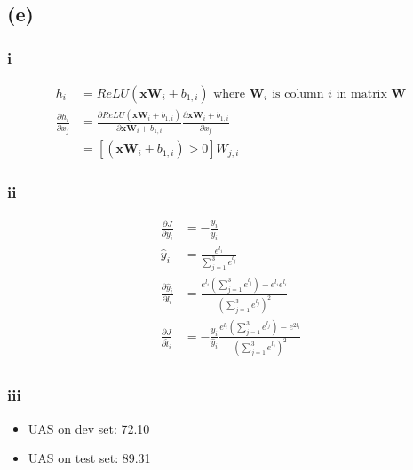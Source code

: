 \documentclass[11pt]{article}
\newcommand{\bvec}[1]{\textbf{#1}}
\begin{document}
\begin{enumerate}
\subsection*{(e)}
\subsubsection*{i}
  \begin{align*}
    h_i &= ReLU(\bvec{x}\bvec{W}_i+b_{1,i}) \text{  where $\bvec{W}_i$ is column $i$ in matrix $\bvec{W}$}\\
    \frac{\partial h_i}{\partial x_j} &= \frac{\partial ReLU(\bvec{x}\bvec{W}_i+b_{1,i})}{\partial \bvec{x}\bvec{W}_i+b_{1,i}} \frac{\partial \bvec{x}\bvec{W}_i+b_{1,i}}{\partial x_j}\\
      &= [(\bvec{x}\bvec{W}_i+b_{1,i}) > 0]W_{j, i}
  \end{align*}

\subsubsection*{ii}
  \begin{align*}
    \frac{\partial J}{\partial \hat{y}_i} &= -\frac{y_i}{\hat{y}_i}\\
    \hat{y}_i &= \frac{e^{l_i}}{\sum_{j=1}^{3}e^{l_j}}\\
    \frac{\partial \hat{y}_i}{\partial l_i} &= \frac{e^{l_i}(\sum_{j=1}^{3}e^{l_j}) - e^{l_i}e^{l_i}}{(\sum_{j=1}^{3}e^{l_j})^2}\\
    \frac{\partial J}{\partial \hat{l}_i} &=  -\frac{y_i}{\hat{y}_i}\frac{e^{l_i}(\sum_{j=1}^{3}e^{l_j}) - e^{2l_i}}{(\sum_{j=1}^{3}e^{l_j})^2}\\
  \end{align*}

\subsubsection*{iii}
\begin{itemize}
  \item UAS on dev set: 72.10
  \item UAS on test set: 89.31
\end{itemize}

\end{enumerate}
\end{document}
